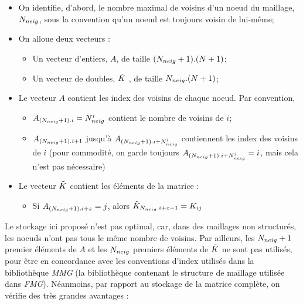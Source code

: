 
\begin{itemize}
	\item On identifie, d'abord, le nombre maximal de voisins d'un noeud du maillage, \(N_{neig}\), sous la convention qu'un noeud est toujours voisin de lui-même;
	\item On alloue deux vecteurs :  
	\begin{itemize}
		\item Un vecteur d'entiers, \(A\), de taille \((N_{neig}+1).(N+1)\);
		\item Un vecteur de doubles, \(\tilde{K}\) , de taille \(N_{neig}.(N+1)\);
	\end{itemize}
	\item Le vecteur \(A\) contient les index des voisins de chaque noeud. Par convention,
	\begin{itemize}
		\item \(A_{(N_{neig}+1).i} = N_{neig}^i\) contient le nombre de voisins de \(i\);
		\item \(A_{(N_{neig}+1).i+1}\) jusqu'à \(A_{(N_{neig}+1).i+N_{neig}^i}\) contiennent les index des voisins de \(i\) (pour commodité, on garde toujours \(A_{(N_{neig}+1).i+N_{neig}^i} = i\), mais cela n'est pas nécessaire)
	\end{itemize}
	\item Le vecteur \(\tilde{K}\) contient les éléments de la matrice : 
	\begin{itemize}
		\item Si \(A_{(N_{neig}+1).i + z} = j\), alors \(\tilde{K}_{N_{neig} . i + z - 1} = K_{ij}\)
	\end{itemize}
\end{itemize}

\indent Le stockage ici proposé n'est pas optimal, car, dans des maillages non structurés, les noeuds n'ont pas tous le même nombre de voisins. Par ailleurs, les \(N_{neig}+1\) premier éléments de \(A\) et les \(N_{neig}\) premiers éléments de \(\tilde{K}\) ne sont pas utilisés, pour être en concordance avec les conventions d'index utilisés dans la bibliothèque \emph{MMG} (la bibliothèque contenant le structure de maillage utilisée dans \emph{FMG}). Néanmoins, par rapport au stockage de la matrice complète, on vérifie des très grandes avantages : 

